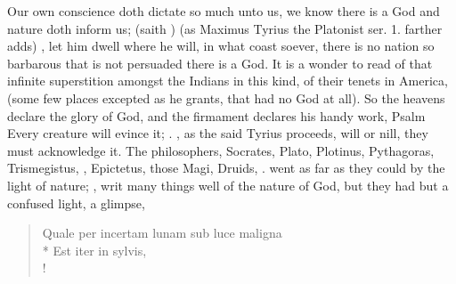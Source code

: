 {Our own conscience doth dictate so much unto us, we know there is a God
and nature doth inform us;  (saith \Tully)  (as Maximus Tyrius the Platonist \textlatin{ser.
1.} farther adds) , let him dwell
where he will, in what coast soever, there is no nation so barbarous
that is not persuaded there is a God. It is a wonder to read of that
infinite superstition amongst the Indians in this kind, of their tenets
in America,  (some few places excepted as he grants, that had no God at
all). So the heavens declare the glory of God, and the firmament
declares his handy work, Psalm  Every creature will evince it;
. , as the said Tyrius proceeds, will or nill, they must
acknowledge it. The philosophers, Socrates, Plato, Plotinus,
Pythagoras, Trismegistus, \Seneca, Epictetus, those Magi, Druids, \etc{}.
went as far as they could by the light of nature; , writ many things well of
the nature of God, but they had but a confused light, a glimpse,

\begin{latin}
\begin{verse}%
Quale per incertam lunam sub luce maligna\\*
Est iter in sylvis,\\!
\end{verse}%
\end{latin}

}
